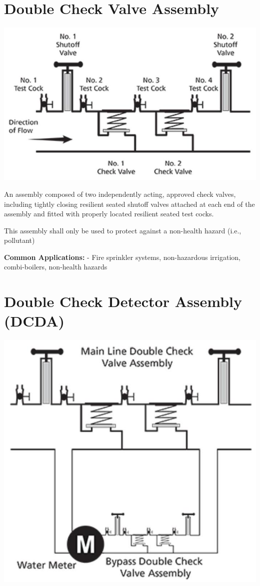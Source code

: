 \documentclass[10pt]{article}
\begin{document}
\section{Double Check Valve Assembly}
\includegraphics[max width=\textwidth]{DoubleCheckValve}

An assembly composed of two independently acting, approved check valves, including tightly closing resilient seated shutoff valves attached at each end of the assembly and fitted with properly located resilient seated test cocks.

This assembly shall only be used to protect against a non-health hazard (i.e., pollutant)

\textbf{Common Applications: } - Fire sprinkler systems, non-hazardous irrigation, combi-boilers, non-health hazards
\newpage
\section{Double Check Detector Assembly (DCDA)}
\includegraphics[max width=\textwidth]{DoubleCheckDetector}
\end{document}
